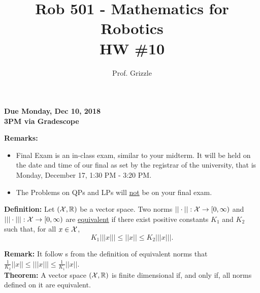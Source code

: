 \documentclass[letterpaper]{article}
\author{Prof. Grizzle}
\title{Rob 501 - Mathematics for Robotics\\
HW \#10}
\begin{document}
\date{}
\maketitle


 \newcommand{\trace}{\mathrm{trace}}
\newcommand{\real}{\mathbb R}  %
\newcommand{\nat}{\mathbb N}   %
\newcommand{\cp}{\mathbb C}    %
\newcommand{\ds}{\displaystyle}
\newcommand{\mf}[2]{\frac{\ds #1}{\ds #2}}
\newcommand{\Nagy}[2]{{Nagy, Page~#1, }{Prob.~#2}}
\newcommand{\spanof}[1]{\textrm{span} \{ #1 \}}
\parindent 0pt


\begin{flushright}
{\bfseries Due Monday, Dec 10, 2018} \\
{\bfseries 3PM via Gradescope} \\[3mm]
\end{flushright}

\noindent \textbf{Remarks:}
 \begin{itemize}
 \item Final Exam is an in-class exam, similar to your midterm. It will be held on the date and time of our final as set by the registrar of the university, that is Monday, December 17, 1:30 PM - 3:20 PM.
     \item  The Problems on QPs and LPs will \underline{not} be on your final exam.
     \end{itemize}

     \vspace*{1cm}

 \noindent \textbf{Definition:} Let $({\cal X}, \real)$ be a vector space. Two norms $||\cdot||:{\cal X} \to[0, \infty)$ and $|||\cdot|||:{\cal X} \to [0, \infty)$ are \underline{equivalent} if there exist positive constants $K_1$ and $K_2$ such that, for all $x\in {\cal X}$,
    $$K_1 |||x||| \le ||x|| \le K_2 |||x|||. $$

    \noindent \textbf{Remark:} It follow s from the definition of equivalent norms that
$ \frac{1}{K_2}||x|| \le |||x||| \le \frac{1}{K_1} ||x||. $  \\


 \noindent \textbf{Theorem:}  A vector space $({\cal X}, \real)$ is finite dimensional if, and only if, all norms defined on it are equivalent.\\ \\
\end{document}
